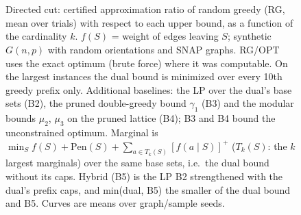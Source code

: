 \begin{figure}[t]
\centering
\setlength{\rgplotwidth}{0.49\columnwidth}
\\[1pt]
\hfill
\\
\hfill

\caption{Directed cut: certified approximation ratio of random greedy (RG, mean over trials) with respect to each upper bound, as a function of the cardinality $k$. $f(S)$ = weight of edges leaving $S$; synthetic $G(n,p)$ with random orientations and SNAP graphs. RG/OPT uses the exact optimum (brute force) where it was computable. On the largest instances the dual bound is minimized over every 10th greedy prefix only. Additional baselines: the LP over the dual's base sets (B2), the pruned double-greedy bound $\gamma_1$ (B3) and the modular bounds $\mu_2$, $\mu_3$ on the pruned lattice (B4); B3 and B4 bound the unconstrained optimum. Marginal is $\min_S f(S)+\mathrm{Pen}(S)+\sum_{a\in T_k(S)}[f(a\mid S)]^+$ ($T_k(S)$: the $k$ largest marginals) over the same base sets, i.e.\ the dual bound without its caps. Hybrid (B5) is the LP B2 strengthened with the dual's prefix caps, and min(dual, B5) the smaller of the dual bound and B5. Curves are means over graph/sample seeds.}
\label{fig:rg-directed_cut-hybrid}
\end{figure}
